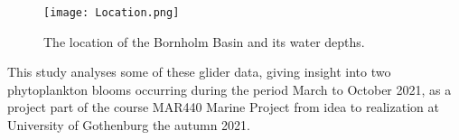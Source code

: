 \documentclass[../Main.tex]{subfiles}
\begin{document}
\begin{figure}[H]
\texttt{[image: Location.png]}
\caption{The location of the Bornholm Basin and its water depths.\supercite{}}
\end{figure}


This study analyses some of these glider data, giving insight into two phytoplankton blooms occurring during the period March to October 2021, 
as a project part of the course MAR440 Marine Project from idea to realization at University of Gothenburg the autumn 2021.
\end{document}

